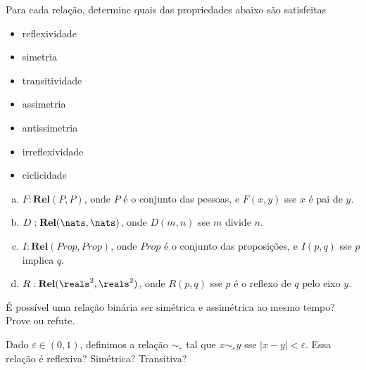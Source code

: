 \begin{exercise}
Para cada relação, determine quais das propriedades abaixo são satisfeitas
\begin{itemize}
    \item reflexividade
    \item simetria
    \item transitividade
    \item assimetria
    \item antissimetria
    \item irreflexividade
    \item ciclicidade
\end{itemize}

\begin{enumerate}[(a)]
    \item $F : \textbf{Rel}(P,P)$, onde $P$ é o conjunto das pessoas, e $F(x,y)$ sse $x$ é pai de $y$.
    \item $D : \textbf{Rel}(\nats,\nats)$, onde $D(m,n)$ sse $m$ divide $n$.
    \item $I : \textbf{Rel}(Prop, Prop)$, onde $Prop$ é o conjunto das proposições, e $I(p,q)$ sse $p$ implica $q$.
    \item $R : \textbf{Rel}(\reals^2,\reals^2)$, onde $R(p,q)$ sse $p$ é o reflexo de $q$ pelo eixo $y$.
\end{enumerate}
\end{exercise}

\begin{exercise}
É possível uma relação binária ser simétrica e assimétrica ao mesmo tempo? Prove ou refute.
\end{exercise}

\begin{exercise}
Dado $\varepsilon \in (0,1)$, definimos a relação $\sim_\varepsilon$ tal que $x \sim_\varepsilon y$ sse $|x-y| < \varepsilon$. Essa relação é reflexiva? Simétrica? Transitiva?
\end{exercise}
